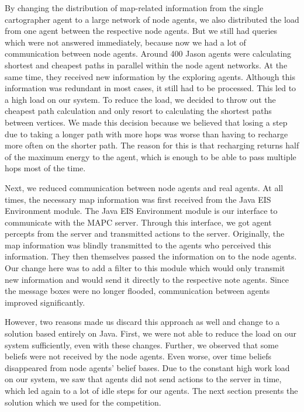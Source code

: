 By changing the distribution of map-related information from the single cartographer agent to a large network of node agents, we also distributed the load from one agent between the respective node agents.
But we still had queries which were not answered immediately, because now we had a lot of communication between node agents.
Around 400 Jason agents were calculating shortest and cheapest paths in parallel within the node agent networks.
At the same time, they received new information by the exploring agents.
Although this information was redundant in most cases, it still had to be processed.
This led to a high load on our system.
To reduce the load, we decided to throw out the cheapest path calculation and only resort to calculating the shortest paths between vertices.
We made this decision because we believed that losing a step due to taking a longer path with more hops was worse than having to recharge more often on the shorter path.
The reason for this is that recharging returns half of the maximum energy to the agent, which is enough to be able to pass multiple hops most of the time.

Next, we reduced communication between node agents and real agents.
At all times, the necessary map information was first received from the Java EIS Environment module.
The Java EIS Environment module is our interface to communicate with the MAPC server.
Through this interface, we got agent percepts from the server and transmitted actions to the server.
Originally, the map information was blindly transmitted to the agents who perceived this information.
They then themselves passed the information on to the node agents.
Our change here was to add a filter to this module which would only transmit new information and would send it directly to the respective note agents.
Since the message boxes were no longer flooded, communication between agents improved significantly.

However, two reasons made us discard this approach as well and change to a solution based entirely on Java.
First, we were not able to reduce the load on our system sufficiently, even with these changes.
Further, we observed that some beliefs were not received by the node agents.
Even worse, over time beliefs disappeared from node agents' belief bases.
Due to the constant high work load on our system, we saw that agents did not send actions to the server in time, which led again to a lot of idle steps for our agents.
The next section presents the solution which we used for the competition.

